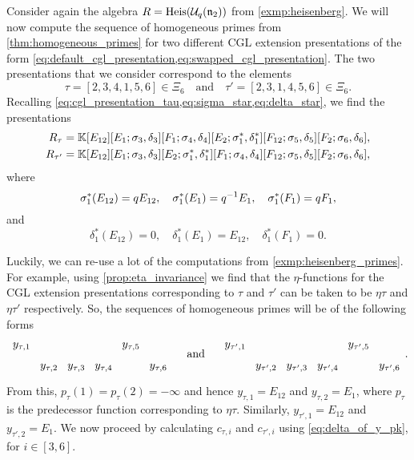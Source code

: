 \begin{example}\label{exmp:heisenberg_two_presentations}

	Consider again the algebra $R = \operatorname{Heis}(\mathcal{U}_q(\mathfrak{n}_2))$ from
	\cref{exmp:heisenberg}. We will now compute the sequence of homogeneous primes from
	\cref{thm:homogeneous_primes} for two different CGL extension presentations of the form
	\cref{eq:default_cgl_presentation,eq:swapped_cgl_presentation}. The two presentations
	that we consider correspond to the elements
	\begin{equation*}
		\tau = [2,3,4,1,5,6] \in \Xi_6 \quad \text{and}\quad \tau' = [2,3,1,4,5,6] \in \Xi_6.
	\end{equation*}
	Recalling \cref{eq:cgl_presentation_tau,eq:sigma_star,eq:delta_star}, we find the
	presentations
	\begin{align*}
		R_\tau    & = \mathbb{K}[E_{12}][E_1; \sigma_3, \delta_3][F_1; \sigma_4, \delta_4][E_2; \sigma_1^*, \delta_1^*][F_{12};\sigma_5, \delta_5][F_2; \sigma_6, \delta_6], \\
		R_{\tau'} & = \mathbb{K}[E_{12}][E_1; \sigma_3, \delta_3][E_2; \sigma_1^*, \delta_1^*][F_1; \sigma_4, \delta_4][F_{12};\sigma_5, \delta_5][F_2; \sigma_6, \delta_6],
	\end{align*}
	where
	\begin{equation*}
		\sigma_1^*(E_{12}) = q E_{12}, \quad \sigma_1^*(E_1) = q^{-1} E_1, \quad \sigma_1^*(F_1) = q F_1,
	\end{equation*}
	and
	\begin{equation*}
		\delta_1^*(E_{12}) = 0, \quad \delta_1^*(E_1) = E_{12}, \quad \delta_1^*(F_1) = 0.
	\end{equation*}

	Luckily, we can re-use a lot of the computations from \cref{exmp:heisenberg_primes}.
	For example, using \cref{prop:eta_invariance} we find that the $\eta$-functions for the
	CGL extension presentations corresponding to $\tau$ and $\tau'$ can be taken to be
	$\eta\tau$ and $\eta \tau'$ respectively. So, the sequences of homogeneous primes will
	be of the following forms
	\begin{equation*}
		\begin{tikzcd}[column sep=0pt, row sep=tiny]
			y_{\tau,1} & & & & y_{\tau,5} \\
			& y_{\tau,2} & y_{\tau,3} & y_{\tau,4} & & y_{\tau,6}
		\end{tikzcd}
		\quad\text { and }\quad
		\begin{tikzcd}[column sep=0pt,row sep=tiny]
			y_{\tau',1} & & & & y_{\tau',5} \\
			& y_{\tau',2} & y_{\tau',3} & y_{\tau',4} & & y_{\tau',6}
		\end{tikzcd}.
	\end{equation*}
	From this, $p_\tau(1) = p_\tau(2) = -\infty$ and hence $y_{\tau, 1} = E_{12}$ and
	$y_{\tau, 2} = E_1$, where $p_\tau$ is the predecessor function corresponding to
	$\eta\tau$. Similarly, $y_{\tau', 1} = E_{12}$ and $y_{\tau', 2} = E_1$. We now proceed
	by calculating $c_{\tau, i}$ and $c_{\tau', i}$ using \cref{eq:delta_of_y_pk}, for $i
		\in [3, 6]$.


\end{example}
